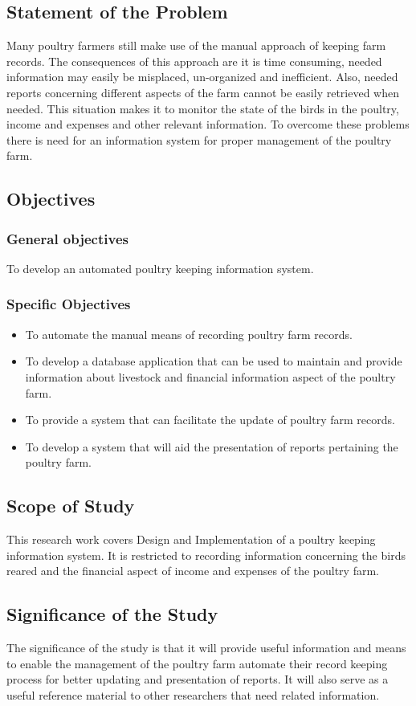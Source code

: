 \documentclass{article}
\begin{document}
\subsection{Statement of the Problem}
Many poultry farmers still make use of the manual approach of keeping farm records. The consequences of this approach are it is time consuming, needed information may easily be misplaced, un-organized and inefficient. Also, needed reports concerning different aspects of the farm cannot be easily retrieved when needed. This situation makes it to monitor the state of the birds in the poultry, income and expenses and other relevant information. To overcome these problems there is need for an information system for proper management of the poultry farm.
\subsection{Objectives}
\subsubsection{General objectives}
To develop an automated poultry keeping information system.
\subsubsection{Specific Objectives}
\begin{itemize}
  \item To automate the manual means of recording poultry farm records.
  \item To develop a database application that can be used to maintain and provide information about livestock and financial information aspect of the poultry farm.
  \item To provide a system that can facilitate the update of poultry farm records.
  \item To develop a system that will aid the presentation of reports pertaining the poultry farm.
\end{itemize}
\subsection{Scope of Study}
This research work covers Design and Implementation of a poultry keeping information system. It is restricted to recording information concerning the birds reared and the financial aspect of income and expenses of the poultry farm.
\subsection{Significance of the Study}
The significance of the study is that it will provide useful information and means to enable the management of the poultry farm automate their record keeping process for better updating and presentation of reports. It will also serve as a useful reference material to other researchers that need related information.
\end{document}
